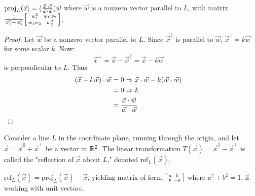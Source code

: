 \documentclass[a4paper,11pt]{article}
\begin{document}
\begin{outline}
    \(\text{proj}_{L}(\vec{x}) = (\frac{\vec{x}\cdot\vec{w}}{\vec{w}\cdot\vec{w}})\vec{w}\) 
    where \(\vec{w}\) is a nonzero vector parallel to \(L\), with matrix \(\frac{1}{w_1^2 + w_2^2}
    \begin{bsmallmatrix} w_1^2&w_1w_2\\ w_1w_2&w_2^2 \end{bsmallmatrix}\).
    
    \begin{proof}
      Let \(\vec{w}\) be a nonzero vector parallel to \(L\). Since \(\vec{x}^{\parallel}\) 
      is parallel to \(\vec{w}\),
      \(\vec{x}^{\parallel} = k\vec{w}\) for some scalar \(k\). Now:
      \[
        \vec{x}^{\perp} = \vec{x} - \vec{x}^{\parallel} = \vec{x} - k\vec{w}
      \]
      is perpendicular to \(L\). Thus
      \begin{align*}
        (\vec{x} - k\vec{w}) \cdot \vec{w} &= 0 \Rightarrow \vec{x}\cdot\vec{w} - k(\vec{w}\cdot\vec{w})\\
                                           &= 0 \Rightarrow k\\
                                           &= \frac{\vec{x}\cdot\vec{w}}{\vec{w}\cdot\vec{w}}
      \end{align*}
    \end{proof}

    Consider a line \(L\) in the coordinate plane, running through the origin, and let 
    \(\vec{x} = \vec{x}^{\parallel} + \vec{x}^{\perp}\) be a vector in \(\mathbb{R}^2\). The linear transformation
    \(T(\vec{x}) = \vec{x}^{\parallel} - \vec{x}^{\perp}\) is called the "reflection of \(\vec{x}\) about \(L\)," 
    denoted \(\text{ref}_{L}(\vec{x})\).
    
    \(\text{ref}_{L}(\vec{x}) = \text{proj}_{L}(\vec{x}) - \vec{x}\), yielding matrix of form 
    \(\begin{bsmallmatrix} a&b\\ b&-a \end{bsmallmatrix}\) where \(a^2 + b^2 = 1\), if working with unit vectors.
    

\end{outline}
\end{document}

